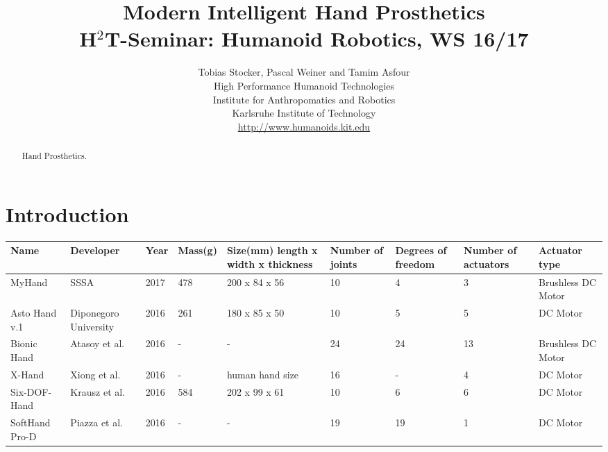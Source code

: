 \documentclass[a4paper, 10pt, conference]{ieeeconf}      %
\title{\bf {\LARGE Modern Intelligent Hand Prosthetics} \\ 
{\normalsize H$^2$T-Seminar: Humanoid Robotics, WS 16/17}}
\author{Tobias Stocker, Pascal Weiner and Tamim Asfour \\ High Performance Humanoid Technologies \\ Institute for Anthropomatics and Robotics \\ Karlsruhe Institute of Technology \\
\url{http://www.humanoids.kit.edu}}
\begin{document}
\maketitle
\thispagestyle{empty}
\pagestyle{empty}
%
\begin{abstract}
Hand Prosthetics.
\end{abstract}

\section{Introduction}

\vspace{1cm}

\begin{tabular}{l|p{2cm}|p{1cm}|p{1.2cm}|p{2.2cm}|p{1.2cm}|p{1.2cm}|p{1.2cm}|p{2cm}}

Name & Developer & Year & Mass(g) & Size(mm) length x width x thickness & Number of joints & Degrees of freedom & Number of \newline actuators & Actuator type\\
\hline
MyHand & SSSA & 2017 & 478 & 200 x 84 x 56 & 10 & 4 & 3 & Brushless DC Motor\\
\hline
Asto Hand v.1 & Diponegoro University & 2016 & 261 & 180 x 85 x 50 & 10 & 5 & 5 & DC Motor\\
\hline
Bionic Hand & Atasoy et al. & 2016 & - & - & 24 & 24 & 13 & Brushless DC Motor\\
\hline
X-Hand & Xiong et al. & 2016 & - & human hand size & 16 & - & 4 & DC Motor\\
\hline
Six-DOF-Hand & Krausz et al. & 2016 & 584 & 202 x 99 x 61 & 10 & 6 & 6 & DC Motor\\
\hline
SoftHand Pro-D & Piazza et al. & 2016 & - & - & 19 & 19 & 1 & DC Motor\\

\end{tabular}

\vspace{3cm}
\end{document}
